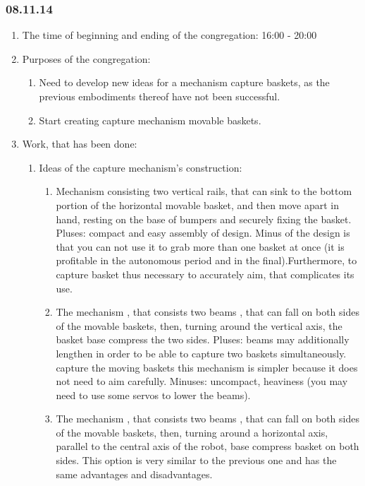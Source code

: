 
\subsubsection{08.11.14}

\begin{enumerate}
	\item The time of beginning and ending of the congregation:
	16:00 - 20:00
	\item Purposes of the congregation:
	\begin{enumerate}
		\item Need to develop new ideas for a mechanism capture baskets, as the previous embodiments thereof have not been successful.
		
		\item Start creating capture mechanism movable baskets.
		
	\end{enumerate}
	
	\item Work, that has been done:
	\begin{enumerate}
		\item Ideas of the capture mechanism's construction:
		\begin{enumerate}
			\item Mechanism consisting two vertical rails, that can sink to the bottom portion of the horizontal movable basket, and then move apart in hand, resting on the base of bumpers and securely fixing the basket. Pluses: compact and easy assembly of design. Minus of the design is that you can not use it to grab more than one basket at once (it is profitable in the autonomous period and in the final).Furthermore, to capture basket thus necessary to accurately aim, that complicates its use.
			
			\item The mechanism , that consists two beams , that can fall on both sides of the movable baskets, then, turning around the vertical axis, the basket base compress the two sides. Pluses: beams may additionally lengthen in order to be able to capture two baskets simultaneously. capture the moving baskets this mechanism is simpler because it does not need to aim carefully. Minuses: uncompact, heaviness (you may need to use some servos to lower the beams).
			
			\item The mechanism , that consists two beams , that can fall on both sides of the movable baskets, then, turning around a horizontal axis, parallel to the central axis of the robot, base compress basket on both sides. This option is very similar to the previous one and has the same advantages and disadvantages.
			

\end{enumerate}
\end{enumerate}
\end{enumerate}

